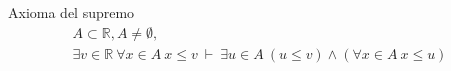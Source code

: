 \begin{axiom} \label{real_lub}
	Axioma del supremo
	\begin{equation} \label{eq_real_lub}
	\begin{gathered}
		A \subset \mathbb{R}, A \neq \emptyset, \\
		\exists v \in \mathbb{R}\ \forall x \in A\ x \leq v\ \vdash\ \exists u \in A\ (u \leq v) \land (\forall x \in A\ x \leq u)
	\end{gathered}
	\end{equation}
\end{axiom}